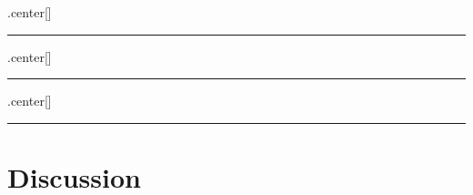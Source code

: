 \documentclass[]{article}
\begin{document}
.center{[}{]}

\begin{center}\rule{0.5\linewidth}{\linethickness}\end{center}

.center{[}{]}

\begin{center}\rule{0.5\linewidth}{\linethickness}\end{center}

.center{[}{]}

\begin{center}\rule{0.5\linewidth}{\linethickness}\end{center}

\section{Discussion}\label{discussion}
\end{document}
